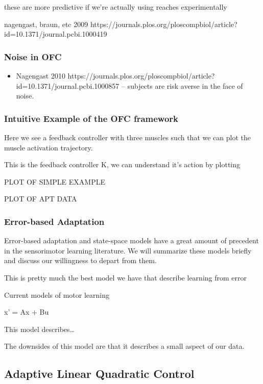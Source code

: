 these are more predictive if we're actually using reaches experimentally

nagengast, braun, etc 2009
https://journals.plos.org/ploscompbiol/article?id=10.1371/journal.pcbi.1000419

\subsubsection{Noise in OFC}\label{noise-in-ofc}

\begin{itemize}
\tightlist
\item
  Nagengast 2010
  https://journals.plos.org/ploscompbiol/article?id=10.1371/journal.pcbi.1000857
  -- subjects are risk averse in the face of noise.
\end{itemize}

\subsubsection{Intuitive Example of the OFC
framework}\label{intuitive-example-of-the-ofc-framework}

Here we see a feedback controller with three muscles such that we can
plot the muscle activation trajectory.

This is the feedback controller K, we can understand it's action by
plotting

PLOT OF SIMPLE EXAMPLE

PLOT OF APT DATA

\subsubsection{Error-based Adaptation}\label{error-based-adaptation}

Error-based adaptation and state-space models have a great amount of
precedent in the sensorimotor learning literature. We will summarize
these models briefly and discuss our willingness to depart from them.

This is pretty much the best model we have that describe learning from
error

Current models of motor learning

x' = Ax + Bu

This model describes\ldots{}

The downsides of this model are that it describes a small aspect of our
data.

\subsection{Adaptive Linear Quadratic
Control}\label{adaptive-linear-quadratic-control}

